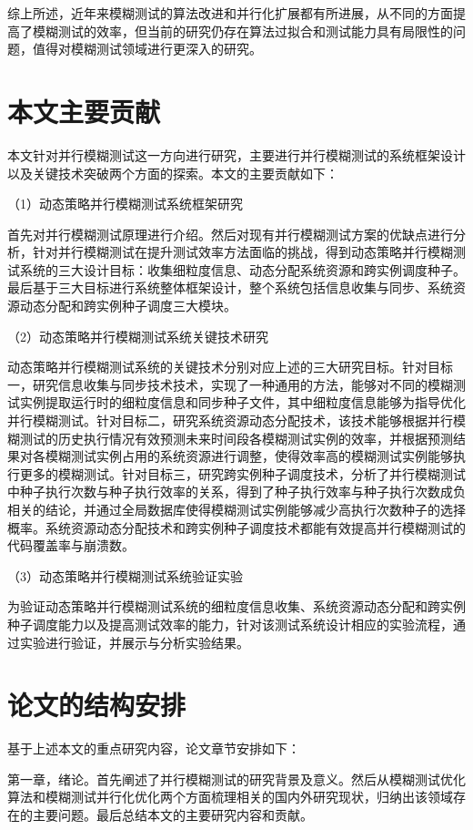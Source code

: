 \documentclass[master]{thesis-uestc}
\begin{document}
综上所述，近年来模糊测试的算法改进和并行化扩展都有所进展，从不同的方面提高了模糊测试的效率，但当前的研究仍存在算法过拟合和测试能力具有局限性的问题，值得对模糊测试领域进行更深入的研究。
\section{本文主要贡献}
本文针对并行模糊测试这一方向进行研究，主要进行并行模糊测试的系统框架设计以及关键技术突破两个方面的探索。本文的主要贡献如下：

（1）动态策略并行模糊测试系统框架研究

首先对并行模糊测试原理进行介绍。然后对现有并行模糊测试方案的优缺点进行分析，针对并行模糊测试在提升测试效率方法面临的挑战，得到动态策略并行模糊测试系统的三大设计目标：收集细粒度信息、动态分配系统资源和跨实例调度种子。最后基于三大目标进行系统整体框架设计，整个系统包括信息收集与同步、系统资源动态分配和跨实例种子调度三大模块。

（2）动态策略并行模糊测试系统关键技术研究

动态策略并行模糊测试系统的关键技术分别对应上述的三大研究目标。针对目标一，研究信息收集与同步技术技术，实现了一种通用的方法，能够对不同的模糊测试实例提取运行时的细粒度信息和同步种子文件，其中细粒度信息能够为指导优化并行模糊测试。针对目标二，研究系统资源动态分配技术，该技术能够根据并行模糊测试的历史执行情况有效预测未来时间段各模糊测试实例的效率，并根据预测结果对各模糊测试实例占用的系统资源进行调整，使得效率高的模糊测试实例能够执行更多的模糊测试。针对目标三，研究跨实例种子调度技术，分析了并行模糊测试中种子执行次数与种子执行效率的关系，得到了种子执行效率与种子执行次数成负相关的结论，并通过全局数据库使得模糊测试实例能够减少高执行次数种子的选择概率。系统资源动态分配技术和跨实例种子调度技术都能有效提高并行模糊测试的代码覆盖率与崩溃数。

（3）动态策略并行模糊测试系统验证实验

为验证动态策略并行模糊测试系统的细粒度信息收集、系统资源动态分配和跨实例种子调度能力以及提高测试效率的能力，针对该测试系统设计相应的实验流程，通过实验进行验证，并展示与分析实验结果。

\section{论文的结构安排}
基于上述本文的重点研究内容，论文章节安排如下：

第一章，绪论。首先阐述了并行模糊测试的研究背景及意义。然后从模糊测试优化算法和模糊测试并行化优化两个方面梳理相关的国内外研究现状，归纳出该领域存在的主要问题。最后总结本文的主要研究内容和贡献。
\end{document}
